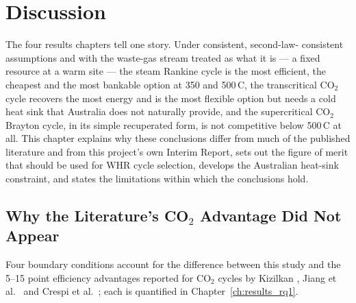 \chapter{Discussion}
\label{ch:discussion}

The four results chapters tell one story. Under consistent, second-law-
consistent assumptions and with the waste-gas stream treated as what it
is --- a fixed resource at a warm site --- the steam Rankine cycle is the
most efficient, the cheapest and the most bankable option at 350 and
500\,\textdegree C, the transcritical CO$_2$ cycle recovers the most energy
and is the most flexible option but needs a cold heat sink that Australia
does not naturally provide, and the supercritical CO$_2$ Brayton cycle, in
its simple recuperated form, is not competitive below 500\,\textdegree C at
all. This chapter explains why these conclusions differ from much of the
published literature and from this project's own Interim Report, sets out
the figure of merit that should be used for WHR cycle selection, develops
the Australian heat-sink constraint, and states the limitations within which
the conclusions hold.

\section{Why the Literature's CO$_2$ Advantage Did Not Appear}
\label{sec:discussion_paradox}

Four boundary conditions account for the difference between this study and
the 5--15 point efficiency advantages reported for CO$_2$ cycles by Kizilkan
\cite{Kizilkan2020}, Jiang et al.~\cite{Jiang2023} and Crespi et
al.~\cite{Crespi2017}; each is quantified in Chapter~\ref{ch:results_rq1}.

